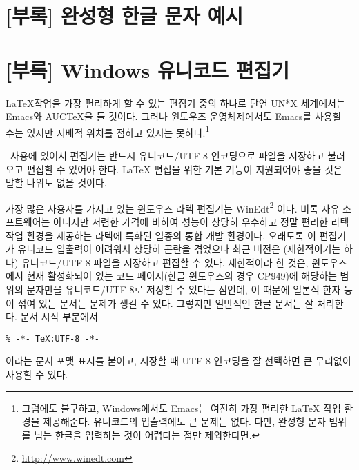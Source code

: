 \section*{[부록] 완성형 한글 문자 예시}\label{kshan}

\begingroup
\parindent=0pt
\sffamily

\ifEUCmode
 
\else
 \interhchar{1pt}
 
\fi
\endgroup

\clearpage{}
\section*{[부록] Windows 유니코드 편집기}

\LaTeX 작업을 가장 편리하게 할 수 있는 편집기 중의 하나로 단연
UN*X 세계에서는 Emacs와 AUCTeX을 들 것이다. 그러나 윈도우즈 운영체제에서도
Emacs를 사용할 수는 있지만 지배적 위치를 점하고 있지는 못하다.\footnote{%
  그럼에도 불구하고, Windows에서도 Emacs는 여전히 가장 편리한
  \LaTeX{} 작업 환경을 제공해준다. 유니코드의 입출력에도 큰 문제는
  없다. 다만, 완성형 문자 범위를 넘는 한글을 입력하는 것이 어렵다는
  점만 제외한다면.}

\kotex~사용에 있어서 편집기는 반드시 유니코드/UTF-8 인코딩으로
파일을 저장하고 불러오고 편집할 수 있어야 한다. \LaTeX{} 편집을
위한 기본 기능이 지원되어야 좋을 것은 말할 나위도 없을 것이다.

가장 많은 사용자를 가지고 있는 윈도우즈 라텍 편집기는 WinEdt\footnote{%
  \url{http://www.winedt.com}}%
이다. 비록 자유 소프트웨어는 아니지만 저렴한 가격에 비하여 성능이
상당히 우수하고 정말 편리한 라텍 작업 환경을 제공하는
라텍에 특화된 일종의 통합 개발 환경이다. 
오래도록 이 편집기가 유니코드 입출력이 어려워서 상당히 곤란을 겪었으나
최근 버전은 (제한적이기는 하나) 유니코드/UTF-8 파일을 저장하고
편집할 수 있다. 제한적이라 한 것은, 윈도우즈에서 현재 활성화되어 있는
코드 페이지(한글 윈도우즈의 경우 CP949)에 해당하는 범위의 문자만을
유니코드/UTF-8로 저장할 수 있다는 점인데, 이 때문에 일본식 한자
등이 섞여 있는 문서는 문제가 생길 수 있다. 
그렇지만 일반적인 한글 문서는 잘 처리한다. 
문서 시작 부분에서
\begin{verbatim}
% -*- TeX:UTF-8 -*-
\end{verbatim}
이라는 문서 포맷 표지를 붙이고, 저장할 때 UTF-8 인코딩을 잘 선택하면
큰 무리없이 사용할 수 있다.

